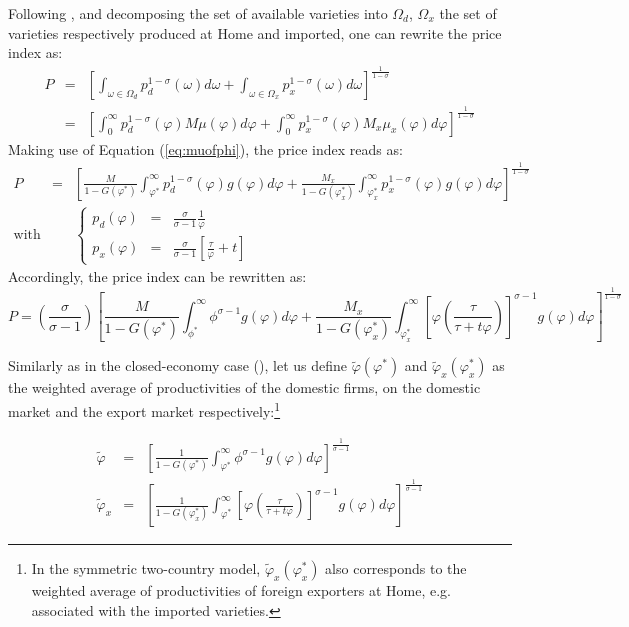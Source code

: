 \documentclass[a4paper,11pt]{article}
\begin{document}
Following \cite{melitz}, and decomposing the set of available varieties into $\Omega_d$, $\Omega_x$ the set of varieties respectively produced at Home and imported, one can rewrite the price index as:
\begin{eqnarray*}
P &=& \left[\int_{\omega \in \Omega_d} p_d^{1-\sigma}(\omega)d\omega + \int_{\omega \in \Omega_x} p_x^{1-\sigma}(\omega)d\omega  \right]^{\frac{1}{1-\sigma}} \\
&=& \left[\int_{0}^\infty p_d^{1-\sigma}(\varphi)M\mu(\varphi)d\varphi + \int_{0}^\infty p_x^{1-\sigma}(\varphi)M_x \mu_x(\varphi)d\varphi  \right]^{\frac{1}{1-\sigma}}
\end{eqnarray*}
Making use of Equation (\ref{eq:muofphi}), the price index reads as:
\begin{eqnarray*}
P &=& \left[\frac{M}{1-G(\varphi^\ast)}\int_{\varphi^\ast}^\infty p_d^{1-\sigma}(\varphi)g(\varphi)d\varphi + \frac{M_x}{1-G(\varphi_x^\ast)}\int_{\varphi^\ast_x}^\infty p_x^{1-\sigma}(\varphi)g(\varphi)d\varphi  \right]^{\frac{1}{1-\sigma}} \\
\text{with}&& \left\{
\begin{array}{lll}
p_d(\varphi)&=& \frac{\sigma}{\sigma-1} \frac{1}{\varphi}\\
p_x(\varphi)&=& \frac{\sigma}{\sigma-1} \left[\frac{\tau}{\varphi} +t\right]
\end{array}
\right.
\end{eqnarray*}
Accordingly, the price index can be rewritten as:
$$P = \left(\frac{\sigma}{\sigma-1}\right)\left[\frac{M}{1-G(\varphi^\ast)}\int_{\phi^\ast}^\infty \phi^{\sigma-1}g(\varphi)d\varphi + \frac{M_x}{1-G(\varphi_x^\ast)}\int_{\varphi^\ast_x}^\infty \left[\varphi \left(\frac{\tau}{\tau+t \varphi}  \right)  \right]^{\sigma-1}g(\varphi)d\varphi  \right]^{\frac{1}{1-\sigma}}$$


Similarly as in the closed-economy case (\cite{melitz}), let us define $\widetilde{\varphi}(\varphi^\ast)$ and $\widetilde{\varphi}_x(\varphi_x^\ast)$ as the weighted average of productivities of the domestic firms, on the domestic market and the export market respectively:\footnote{In the symmetric two-country model, $\widetilde{\varphi}_x(\varphi_x^\ast)$ also corresponds to the weighted average of productivities of foreign exporters at Home, e.g. associated with the imported varieties.}

\begin{eqnarray}
\widetilde{\varphi} &=& \left[\frac{1}{1-G(\varphi^\ast)}\int_{\varphi^\ast}^\infty \phi^{\sigma-1}g(\varphi)d\varphi   \right]^{\frac{1}{\sigma-1}} \label{eq:def_phitilde}\\
\widetilde{\varphi}_x &=& \left[\frac{1}{1-G(\varphi_x^\ast)}\int_{\varphi^\ast}^\infty \left[\varphi\left(\frac{\tau}{\tau+t \varphi}  \right) \right]^{\sigma-1}g(\varphi)d\varphi   \right]^{\frac{1}{\sigma-1}} \label{eq:def_phitildex}
\end{eqnarray}
\end{document}
